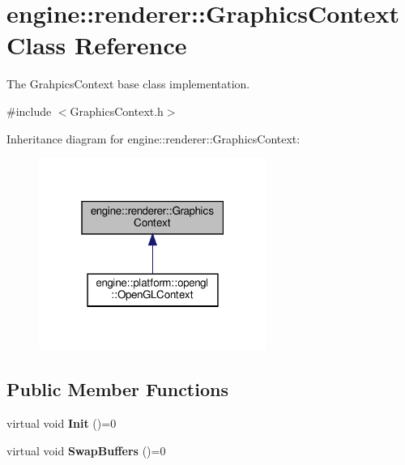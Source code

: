 \hypertarget{classengine_1_1renderer_1_1GraphicsContext}{}\section{engine\+:\+:renderer\+:\+:Graphics\+Context Class Reference}
\label{classengine_1_1renderer_1_1GraphicsContext}


The Grahpics\+Context base class implementation.  




{\ttfamily \#include $<$Graphics\+Context.\+h$>$}



Inheritance diagram for engine\+:\+:renderer\+:\+:Graphics\+Context\+:\nopagebreak
\begin{figure}[H]
\begin{center}
\leavevmode
\includegraphics[width=211pt]{classengine_1_1renderer_1_1GraphicsContext__inherit__graph}
\end{center}
\end{figure}
\subsection*{Public Member Functions}
\begin{DoxyCompactItemize}
\item 
\mbox{\label{classengine_1_1renderer_1_1GraphicsContext_ac7b94c5769b9464cdc2b71366fb0984b}} 
virtual void {\bfseries Init} ()=0
\item 
\mbox{\label{classengine_1_1renderer_1_1GraphicsContext_af4e7d29edd7912d32a07e139aef7a2f9}} 
virtual void {\bfseries Swap\+Buffers} ()=0
\end{DoxyCompactItemize}


